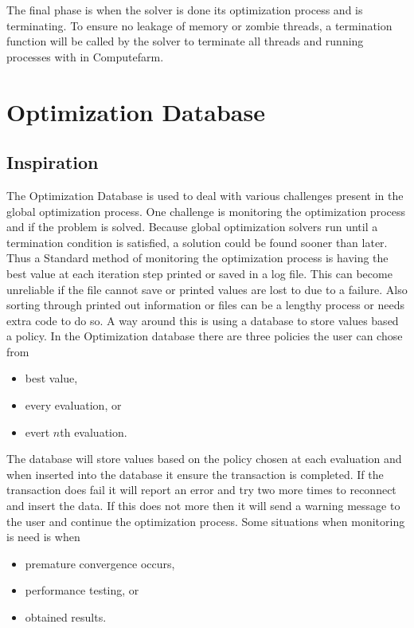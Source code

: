 The final phase is when the solver is done its optimization process and is terminating. To ensure no leakage of memory or zombie threads, a termination function will be called by the solver to terminate all threads and running processes with in Computefarm. 


\section{Optimization Database}
\label{database}
\subsection{Inspiration}
The Optimization Database is used to deal with various challenges present in the global optimization process. One challenge is monitoring the optimization process and if the problem is solved. Because global optimization solvers run until a termination condition is satisfied, a solution could be found sooner than later. Thus a Standard method of monitoring the optimization process is having the best value at each iteration step printed or saved in a log file. This can become
unreliable if the file cannot save or printed values are lost to due to a failure. Also sorting through printed out information or files can be a lengthy process or needs extra code to do so. A way around this is using a database to store values based a policy. In the Optimization database there
are three policies the user can chose from
\begin{itemize}
    \item best value, 
    \item every evaluation, or
    \item evert $n$th evaluation.
\end{itemize}
The database will store values based on the policy chosen at each evaluation and when inserted into the database it ensure the transaction is completed. If the transaction does fail it will report an error and try two more times to reconnect and insert the data. If this does not more then it will send a warning message to the user and continue the optimization process. 
Some situations when monitoring is need is when 
\begin{itemize}
    \item premature convergence occurs, 
    \item performance testing, or
    \item obtained results.
\end{itemize}

